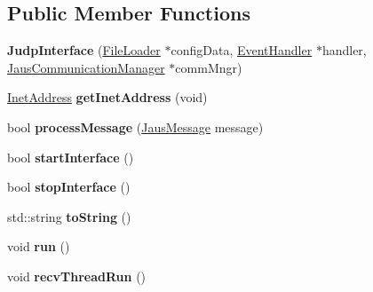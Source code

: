 \subsection*{\-Public \-Member \-Functions}
\begin{DoxyCompactItemize}
\item 
\hypertarget{class_judp_interface_a3d106161bf891b1b581b7065ef71fa4c}{{\bfseries \-Judp\-Interface} (\hyperlink{class_file_loader}{\-File\-Loader} $\ast$config\-Data, \hyperlink{class_event_handler}{\-Event\-Handler} $\ast$handler, \hyperlink{class_jaus_communication_manager}{\-Jaus\-Communication\-Manager} $\ast$comm\-Mngr)}\label{class_judp_interface_a3d106161bf891b1b581b7065ef71fa4c}

\item 
\hypertarget{class_judp_interface_a7c1497d233fdd9c21fc6cc5db943c2f6}{\hyperlink{struct_inet_address_struct}{\-Inet\-Address} {\bfseries get\-Inet\-Address} (void)}\label{class_judp_interface_a7c1497d233fdd9c21fc6cc5db943c2f6}

\item 
\hypertarget{class_judp_interface_aa0fad7d2a574105f9c6aa43243cfcc20}{bool {\bfseries process\-Message} (\hyperlink{struct_jaus_message_struct}{\-Jaus\-Message} message)}\label{class_judp_interface_aa0fad7d2a574105f9c6aa43243cfcc20}

\item 
\hypertarget{class_judp_interface_a45fffac44a13948b2a5255334fa49c0d}{bool {\bfseries start\-Interface} ()}\label{class_judp_interface_a45fffac44a13948b2a5255334fa49c0d}

\item 
\hypertarget{class_judp_interface_a71cfd0bc8ff9f9ba9669a3d25963a64f}{bool {\bfseries stop\-Interface} ()}\label{class_judp_interface_a71cfd0bc8ff9f9ba9669a3d25963a64f}

\item 
\hypertarget{class_judp_interface_ad11f366dc8d3ea63090b138b9a94a3e3}{std\-::string {\bfseries to\-String} ()}\label{class_judp_interface_ad11f366dc8d3ea63090b138b9a94a3e3}

\item 
\hypertarget{class_judp_interface_a6bbb2392223aa610da19761604966c1f}{void {\bfseries run} ()}\label{class_judp_interface_a6bbb2392223aa610da19761604966c1f}

\item 
\hypertarget{class_judp_interface_a80b30768c19e3177fe111c2223139c77}{void {\bfseries recv\-Thread\-Run} ()}\label{class_judp_interface_a80b30768c19e3177fe111c2223139c77}

\end{DoxyCompactItemize}
